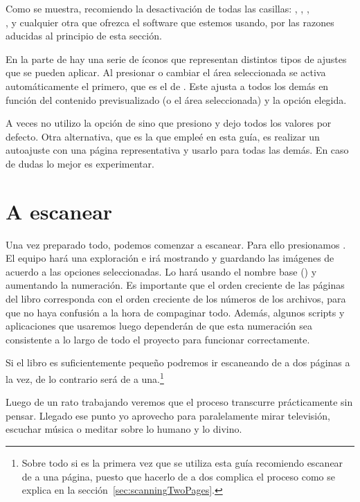 \documentclass[%
	a5paper,
	10pt,
	twoside,
	openright,
	final,
]{memoir}
\begin{document}
{	Como se muestra, recomiendo la desactivación de todas las casillas: , , ,\\,  y cualquier otra que ofrezca el software que estemos usando, por las razones aducidas al principio de esta sección.

	En la parte de  hay una serie de íconos que representan distintos tipos de ajustes que se pueden aplicar. Al presionar  o cambiar el área seleccionada se activa automáticamente el primero, que es el de . Este ajusta a todos los demás en función del contenido previsualizado (o el área seleccionada) y la opción  elegida.

	A veces no utilizo la opción de  sino que presiono  y dejo todos los valores por defecto. Otra alternativa, que es la que empleé en esta guía, es realizar un autoajuste con una página representativa y usarlo para todas las demás. En caso de dudas lo mejor es experimentar.

	\section{A escanear} Una vez preparado todo, podemos comenzar a escanear. Para ello presionamos . El equipo hará una exploración e \irfanview irá mostrando y guardando las imágenes de acuerdo a las opciones seleccionadas. Lo hará usando el nombre base () y aumentando la numeración. Es importante que el orden creciente de las páginas del libro corresponda con el orden creciente de los números de los archivos, para que no haya confusión a la hora de compaginar todo. Además, algunos scripts y aplicaciones que usaremos luego dependerán de que esta numeración sea consistente a lo largo de todo el proyecto para funcionar correctamente.

	Si el libro es suficientemente pequeño podremos ir escaneando de a dos páginas a la vez, de lo contrario será de a una.\footnote{Sobre todo si es la primera vez que se utiliza esta guía recomiendo escanear de a una página, puesto que hacerlo de a dos complica el proceso como se explica en la sección~\ref{sec:scanningTwoPages}.}

	Luego de un rato trabajando veremos que el proceso transcurre prácticamente sin pensar. Llegado ese punto yo aprovecho para paralelamente mirar televisión, escuchar música o meditar sobre lo humano y lo divino.

}
\end{document}
